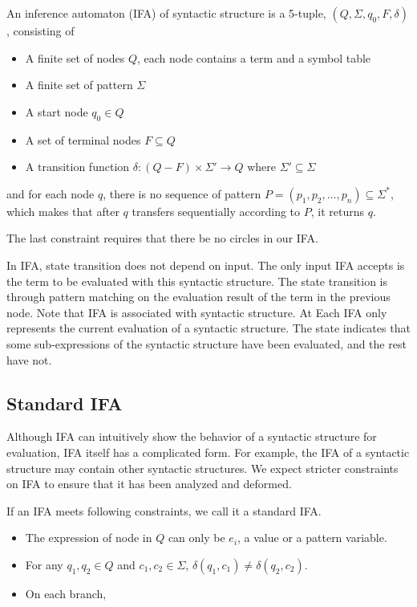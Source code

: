 \begin{Def}

An inference automaton (IFA) of syntactic structure  is a 5-tuple, $(Q, \Sigma, q_0, F, \delta)$, consisting of

\begin{itemize}
    \item A finite set of nodes $Q$, each node contains a term and a symbol table
    \item A finite set of pattern $\Sigma$
    \item A start node $q_0 \in Q$
    \item A set of terminal nodes $F \subseteq Q$ 
    \item A transition function $\delta: (Q-F) \times \Sigma' \to Q$ where $\Sigma' \subseteq \Sigma$
\end{itemize}

and for each node $q$, there is no sequence of pattern $P = (p_1,p_2,\ldots,p_n)\subseteq \Sigma^*$, which makes that after $q$ transfers sequentially according to $P$, it returns $q$.

\end{Def}

The last constraint requires that there be no circles in our IFA. 

In IFA, state transition does not depend on input. The only input IFA accepts is the term to be evaluated with this syntactic structure. The state transition is through pattern matching on the evaluation result of the term in the previous node. Note that IFA is associated with syntactic structure. At Each IFA only represents the current evaluation of a syntactic structure. The state indicates that some 
sub-expressions of the syntactic structure have been evaluated, and the rest have not.

\subsection{Standard IFA}

Although IFA can intuitively show the behavior of a syntactic structure for evaluation, IFA itself has a complicated form. For example, the IFA of a syntactic structure may contain other syntactic structures. We expect stricter constraints on IFA to ensure that it has been analyzed and deformed.

\begin{Def}
\label{def:stdifa}
If an IFA meets following constraints, we call it a standard IFA.
\begin{itemize}
    \item The expression of node in $Q$ can only be $e_i$, a value or a pattern variable.
    \item For any $q_1,q_2 \in Q$ and $c_1, c_2 \in \Sigma$, $\delta(q_1, c_1) \neq \delta(q_2, c_2)$.
    \item On each branch, 
\end{itemize}
\end{Def}

